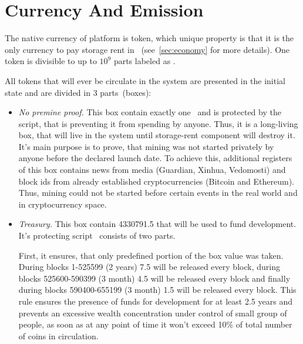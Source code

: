 \section{Currency And Emission}
\label{sec:currency}


The native currency of \Ergo{} platform is \Erg{} token, which unique property is
that it is the only currency to pay storage rent in \Ergo{}~(see~\ref{sec:economy} for more details).
One \Erg{} token is divisible to up to $10^9$ parts labeled as \nanoErg{}.

All \Erg{} tokens that will ever be circulate in the system are presented in the
initial state and are divided in 3 parts~(boxes):

\begin{itemize}
    \item{\em No premine proof.} This box contain exactly one~\Erg{} and is protected by the script,
    that is preventing it from spending by anyone.
    Thus, it is a long-living box, that will live in the system until storage-rent component will
    destroy it.
    It's main purpose is to prove, that \Ergo{} mining was not started privately by anyone before
    the declared launch date.
    To achieve this, additional registers of this box contains news from media (Guardian, Xinhua, Vedomosti)
    and block ids from already established cryptocurrencies (Bitcoin and Ethereum).
    Thus, \Ergo{} mining could not be started before certain events in the real world and in
    cryptocurrency space.

    \item{\em Treasury.} This box contain 4330791.5 \Erg{} that will be used to fund \Ergo{}
    development.
    It's protecting script~\cite{link to corresponding ergo tree} consists of two parts.

    First, it ensures, that only predefined portion of the box value was taken.
    During blocks 1-525599 (2 years) 7.5 \Erg{} will be released every block,
    during blocks 525600-590399 (3 month) 4.5 \Erg{} will be released every block and finally
    during blocks 590400-655199 (3 month) 1.5 \Erg{} will be released every block.
    This rule ensures the presence of funds for \Ergo{} development for at least 2.5 years and
    prevents an excessive wealth concentration under control of small group of people, as soon
    as at any point of time it won't exceed 10\% of total number of coins in circulation.


\end{itemize}
